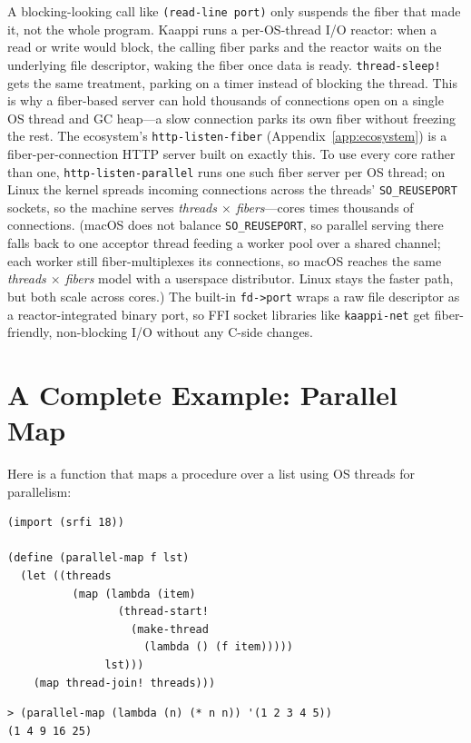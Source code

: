 \begin{note}
A blocking-looking call like \texttt{(read-line port)} only suspends the fiber that made it, not the whole program. Kaappi runs a per-OS-thread I/O reactor: when a read or write would block, the calling fiber parks and the reactor waits on the underlying file descriptor, waking the fiber once data is ready. \texttt{thread-sleep!} gets the same treatment, parking on a timer instead of blocking the thread. This is why a fiber-based server can hold thousands of connections open on a single OS thread and GC heap---a slow connection parks its own fiber without freezing the rest. The ecosystem's \texttt{http-listen-fiber} (Appendix~\ref{app:ecosystem}) is a fiber-per-connection HTTP server built on exactly this. To use every core rather than one, \texttt{http-listen-parallel} runs one such fiber server per OS thread; on Linux the kernel spreads incoming connections across the threads' \texttt{SO\_REUSEPORT} sockets, so the machine serves \emph{threads $\times$ fibers}---cores times thousands of connections. (macOS does not balance \texttt{SO\_REUSEPORT}, so parallel serving there falls back to one acceptor thread feeding a worker pool over a shared channel; each worker still fiber-multiplexes its connections, so macOS reaches the same \emph{threads $\times$ fibers} model with a userspace distributor. Linux stays the faster path, but both scale across cores.) The built-in \texttt{fd->port} wraps a raw file descriptor as a reactor-integrated binary port, so FFI socket libraries like \texttt{kaappi-net} get fiber-friendly, non-blocking I/O without any C-side changes.
\end{note}

\section{A Complete Example: Parallel Map}

Here is a function that maps a procedure over a list using OS threads for parallelism:

\begin{lstlisting}
(import (srfi 18))

(define (parallel-map f lst)
  (let ((threads
          (map (lambda (item)
                 (thread-start!
                   (make-thread
                     (lambda () (f item)))))
               lst)))
    (map thread-join! threads)))
\end{lstlisting}

\begin{lstlisting}[style=repl]
> (parallel-map (lambda (n) (* n n)) '(1 2 3 4 5))
(1 4 9 16 25)
\end{lstlisting}

